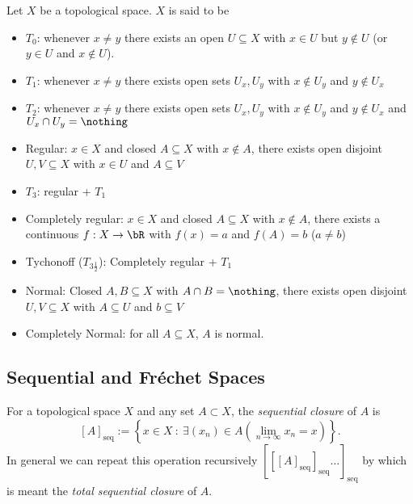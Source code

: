 \documentclass{article}
\newcommand{\seqcl}[1]{{[#1]_{\text{seq}}}}
\begin{document}
\begin{defn}
    Let \(X\) be a topological space. \(X\) is said to be 
    \begin{itemize}
        \item \(T_0\): whenever \(x \neq y\) there exists an open \(U \subseteq X\) with \(x \in U\) but \(y \not \in U\) (or \(y \in U\) and \(x \not \in U\)).
        \item \(T_1\): whenever \(x \neq y\) there exists open sets \(U_x, U_y\) with \(x \not \in U_y\) and \(y \not \in U_x\)
        \item \(T_2\):  whenever \(x \neq y\) there exists open sets \(U_x, U_y\) with \(x \not \in U_y\) and \(y \not \in U_x\) and \(U_x \cap U_y = \nothing\)
        \item Regular: \(x \in X\) and closed \(A \subseteq X\) with \(x \not \in A\), there exists open disjoint \(U, V \subseteq X\) with \(x \in U\) and \(A \subseteq V\)
        \item \(T_3\): regular + \(T_1\)
        \item Completely regular: \(x \in X\) and closed \(A \subseteq X\) with \(x \not \in A\), there exists a continuous \(f: X \to \bR\) with \(f(x) = a\) and \(f(A) = b\) (\(a \neq b\))
        \item Tychonoff (\(T_{3\frac{1}{2}}\)): Completely regular + \(T_1\)
        \item Normal: Closed \(A, B \subseteq X\) with \(A \cap B = \nothing\), there exists open disjoint \(U, V \subseteq X\) with \(A \subseteq U\) and \(b \subseteq V\)
        \item Completely Normal: for all \(A \subseteq X\), \(A\) is normal.
    \end{itemize}
\end{defn}

\subsection{Sequential and Fréchet Spaces}

\begin{defn}
    For a topological space \(X\) and any set \(A \subset X\), the \textit{sequential closure} of \(A\) is  
    \[
        \seqcl{A} := \left\{x \in X \: : \: \exists (x_n) \in A \left(\lim_{n\to \infty} x_n = x\right) \right\}.
    \]
    In general we can repeat this operation recursively \(\seqcl{\seqcl{\seqcl{A}}\dots}\) by which is meant the \textit{total sequential closure} of \(A\).
    
\end{defn}
\end{document}
